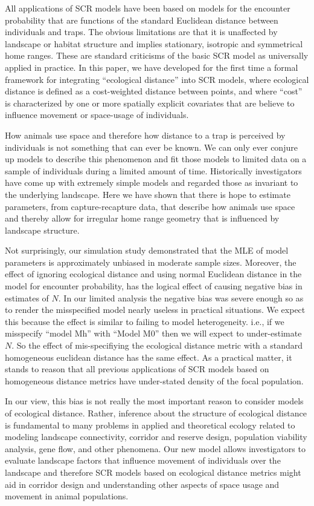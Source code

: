 \documentclass[12pt]{article}
\begin{document}
All applications of SCR models have been based on models for the
encounter probability that are functions of
the standard Euclidean distance between
individuals and traps. The obvious limitations are that it is
unaffected by landscape or habitat structure and implies
stationary,  isotropic and symmetrical home ranges. These are standard
criticisms of the basic SCR model as universally applied in practice.
In this paper,  we have developed for the first time a formal framework
for integrating
``ecological distance'' into SCR models, where ecological distance is
defined as a cost-weighted distance between points, and where ``cost''
is characterized by one or more spatially explicit covariates that are
believe to influence movement or space-usage of individuals.

How animals use space and therefore how distance to a trap is
perceived by individuals is not something that can ever be known. We
can only ever conjure up models to describe this
phenomenon and fit those models to limited data on a sample of individuals
during a limited amount of time.
Historically investigators have come up with extremely simple
models and regarded those as invariant to
the underlying landscape. Here we have shown that there is hope to
estimate parameters, from capture-recapture data,
 that describe how animals use space and thereby
allow for irregular home range geometry that is influenced by
landscape structure.

Not surprisingly, our simulation study demonstrated that the MLE of model
parameters is approximately unbiased in moderate sample
sizes. Moreover, the
effect of ignoring ecological distance and using normal Euclidean
distance in the model for encounter probability, has the
logical effect of causing negative bias
in estimates of $N$. In our limited analysis the negative bias was
severe enough so as to render the misspecified model nearly useless in
practical situations. We expect this because the effect is similar to
failing to model heterogeneity. i.e., if we misspecify ``model Mh'' with
``Model M0'' then we will expect to under-estimate $N$. So the effect of
mis-specifiying the ecological distance metric with a standard
homogeneous euclidean distance has the same effect. As a practical matter,
it stands to reason that all previous applications of SCR models based
on homogeneous distance metrics have under-stated density of the focal
population.

In our view, this bias is not really the most important reason to consider models of
ecological distance. Rather, inference about the structure of
ecological distance is fundamental to many problems in applied and
theoretical ecology related to modeling landscape
connectivity, corridor and reserve design, population viability
analysis, gene flow, and other phenomena.
Our new model
allows investigators to  evaluate landscape
factors that influence movement of individuals over the landscape and
therefore SCR models based on ecological distance metrics might aid in
corridor design and understanding other aspects of space usage and
movement in animal populations.
\end{document}
